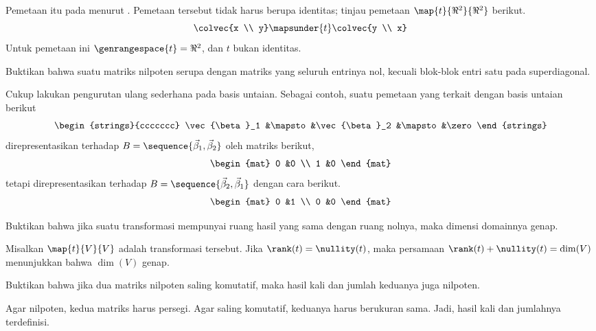 \begin{exercises}
\begin{answer}
      Pemetaan itu pada menurut .
      Pemetaan tersebut tidak harus berupa identitas; tinjau pemetaan
      $\map{t}{\Re^2}{\Re^2}$ berikut.
      \begin{equation*}
        \colvec{x \\ y}\mapsunder{t}\colvec{y \\ x}
      \end{equation*}
      Untuk pemetaan ini $\genrangespace{t}=\Re^2$, dan $t$ bukan identitas.
    \end{answer}
  \item 
    Buktikan bahwa suatu matriks nilpoten serupa dengan matriks yang seluruh
    entrinya nol, kecuali blok-blok entri satu pada superdiagonal.
    \begin{answer}
      Cukup lakukan pengurutan ulang sederhana pada basis untaian.
      Sebagai contoh, suatu pemetaan yang terkait dengan basis untaian berikut
      \begin{equation*}
         \begin{strings}{ccccccc}
            \vec{\beta}_1 &\mapsto &\vec{\beta}_2 &\mapsto &\zero  
         \end{strings}
      \end{equation*}
      direpresentasikan terhadap
      $B=\sequence{\vec{\beta}_1,\vec{\beta}_2}$ oleh matriks berikut,
      \begin{equation*}
        \begin{mat}
          0  &0  \\
          1  &0          
        \end{mat}
      \end{equation*}
      tetapi direpresentasikan terhadap
      $B=\sequence{\vec{\beta}_2,\vec{\beta}_1}$ dengan cara berikut.
      \begin{equation*}
        \begin{mat}
          0  &1  \\
          0  &0          
        \end{mat}
      \end{equation*}
    \end{answer}
  \recommended \item
    Buktikan bahwa jika suatu transformasi mempunyai ruang hasil yang sama
    dengan ruang nolnya, maka dimensi domainnya genap.
    \begin{answer}
      Misalkan $\map{t}{V}{V}$ adalah transformasi tersebut.
      Jika \( \rank (t)=\nullity (t) \), maka persamaan
      \( \rank(t)+\nullity(t)=\dim (V) \) menunjukkan bahwa
      \( \dim (V) \) genap.
    \end{answer}
  \item 
    Buktikan bahwa jika dua matriks nilpoten saling komutatif, maka hasil kali
    dan jumlah keduanya juga nilpoten.
    \begin{answer}
      Agar nilpoten, kedua matriks harus persegi.
      Agar saling komutatif, keduanya harus berukuran sama.
      Jadi, hasil kali dan jumlahnya terdefinisi.


\end{answer}
\end{exercises}
